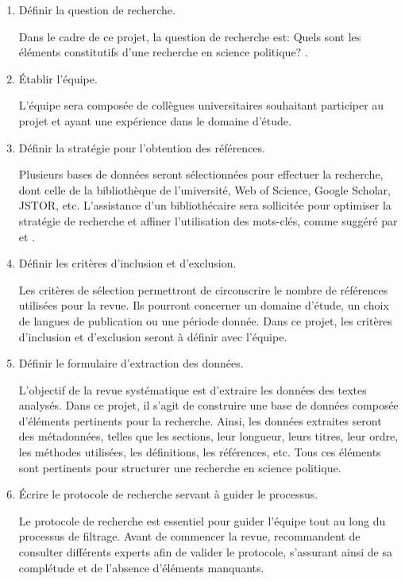 \documentclass[
  letterpaper,
]{scrbook}
\begin{document}
\begin{enumerate}

  \item Définir la question de recherche. 
  
  Dans le cadre de ce projet, la question de recherche est: \og{} Quels sont les éléments constitutifs d'une recherche en science politique? \fg{}.

  \item Établir l'équipe. 
  
    L'équipe sera composée de collègues universitaires souhaitant participer au projet et ayant une expérience dans le domaine d'étude.
  
  \item Définir la stratégie pour l'obtention des références. 
  
    Plusieurs bases de données seront sélectionnées pour effectuer la recherche, dont celle de la bibliothèque de l'université, Web of Science, Google Scholar, JSTOR, etc. L'assistance d'un bibliothécaire sera sollicitée pour optimiser la stratégie de recherche et affiner l'utilisation des mots-clés, comme suggéré par \textcite{cloutier23} et \textcite{dufour23}.

  \item Définir les critères d'inclusion et d'exclusion.
  
    Les critères de sélection permettront de circonscrire le nombre de références utilisées pour la revue. Ils pourront concerner un domaine d'étude, un choix de langues de publication ou une période donnée. Dans ce projet, les critères d'inclusion et d'exclusion seront à définir avec l'équipe.

  \item Définir le formulaire d'extraction des données.

    L'objectif de la revue systématique est d'extraire les données des textes analysés. Dans ce projet, il s'agit de construire une base de données composée d'éléments pertinents pour la recherche. Ainsi, les données extraites seront des métadonnées, telles que les sections, leur longueur, leurs titres, leur ordre, les méthodes utilisées, les définitions, les références, etc. Tous ces éléments sont pertinents pour structurer une recherche en science politique.

  \item Écrire le protocole de recherche servant à guider le processus.
  
    Le protocole de recherche est essentiel pour guider l'équipe tout au long du processus de filtrage. Avant de commencer la revue, \textcite[4]{muka_etal20} recommandent de consulter différents experts afin de valider le protocole, s'assurant ainsi de sa complétude et de l'absence d'éléments manquants.


\end{enumerate}
\end{document}
